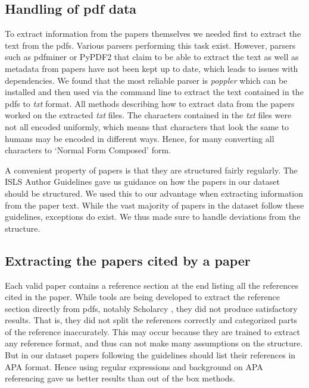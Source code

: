 \documentclass[article,twocolumn]{IEEEtran}
\begin{document}
    \hypertarget{handling-of-pdf-data}{%
\subsection{Handling of pdf data}\label{handling-of-pdf-data}}

To extract information from the papers themselves we needed first to
extract the text from the pdfs. Various parsers performing this task
exist. However, parsers such as pdfminer or PyPDF2 that claim to be able
to extract the text as well as metadata from papers have not been kept
up to date, which leads to issues with dependencies. We found that the
most reliable parser is \emph{poppler} \cite{poppler} which can be
installed and then used via the command line to extract the text
contained in the pdfs to \emph{txt} format. All methods describing how
to extract data from the papers worked on the extracted \emph{txt}
files. The characters contained in the \emph{txt} files were not all
encoded uniformly, which means that characters that look the same to
humans may be encoded in different ways. Hence, for many converting all
characters to `Normal Form Composed' form.

A convenient property of papers is that they are structured fairly
regularly. The ISLS Author Guidelines \cite{guidelines} gave us guidance
on how the papers in our dataset should be structured. We used this to
our advantage when extracting information from the paper text. While the
vast majority of papers in the dataset follow these guidelines,
exceptions do exist. We thus made sure to handle deviations from the
structure.

\hypertarget{extracting-the-papers-cited-by-a-paper}{%
\subsection{Extracting the papers cited by a
paper}\label{extracting-the-papers-cited-by-a-paper}}

Each valid paper contains a reference section at the end listing all the
references cited in the paper. While tools are being developed to
extract the reference section directly from pdfs, notably Scholarcy
\cite{scholarcy}, they did not produce satisfactory results. That is,
they did not split the references correctly and categorized parts of the
reference inaccurately. This may occur because they are trained to
extract any reference format, and thus can not make many assumptions on
the structure. But in our dataset papers following the guidelines should
list their references in APA format. Hence using regular expressions and
background on APA referencing gave us better results than out of the box
methods.
\end{document}
